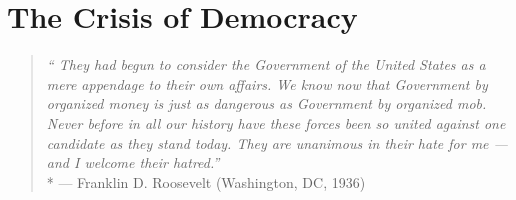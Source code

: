 

\section{The Crisis of Democracy}

\begin{quote}
	\emph{``%
	They had begun to consider the Government of the United States as a mere appendage to their own affairs. We know now that Government by organized money is just as dangerous as Government by organized mob. Never before in all our history have these forces been so united against one candidate as they stand today. They are unanimous in their hate for me --- and I welcome their hatred.''}\\*
	--- Franklin D. Roosevelt (Washington, DC, 1936)
\end{quote}




